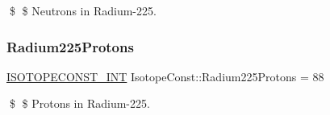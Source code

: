 \$ \$ Neutrons in Radium-\/225. \mbox{\label{group___isotope_const-_radium-_ra225_ga2947655642e26c28b35f58be93a990cc}} 
\subsubsection{\texorpdfstring{Radium225\+Protons}{Radium225Protons}}
{\footnotesize\ttfamily \mbox{\hyperlink{group___isotope_const-_macros_ga5f18360b3e99483a35c32d789e62621c}{I\+S\+O\+T\+O\+P\+E\+C\+O\+N\+S\+T\+\_\+\+I\+NT}} Isotope\+Const\+::\+Radium225\+Protons = 88}

\$ \$ Protons in Radium-\/225. 